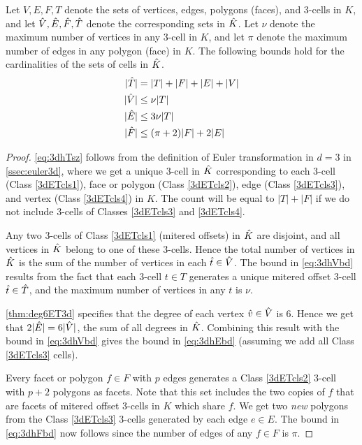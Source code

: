 \begin{lem}
  \label{lem:cntshThVhEhf3d}
  Let $V,E,F,T$ denote the sets of vertices, edges, polygons (faces), and $3$-cells in $K$, and let $\hat{V}, \hat{E}, \hat{F}, \hat{T}$ denote the corresponding sets in $\hat{K}$.
  Let $\nu$ denote the maximum number of vertices in any $3$-cell in $K$, and let $\pi$ denote the maximum number of edges in any polygon (face) in $K$.
  The following bounds hold for the cardinalities of the sets of cells in $\hat{K}$.
  \begin{align}
    |\hat{T}| &   =  |T| + |F| + |E| + |V| \label{eq:3dhTsz} \\
    |\hat{V}| & \leq \nu |T|  \label{eq:3dhVbd} \\
    |\hat{E}| & \leq 3 \nu |T| \label{eq:3dhEbd} \\
    |\hat{F}| & \leq (\pi+2)|F| + 2 |E| \label{eq:3dhFbd}
  \end{align}
\end{lem}
%
\begin{proof}
  \cref{eq:3dhTsz} follows from the definition of Euler transformation in $d=3$ in \cref{ssec:euler3d}, where we get a unique $3$-cell in $\hat{K}$ corresponding to each $3$-cell (Class \ref{3dETcls1}), face or polygon (Class \ref{3dETcls2}), edge (Class \ref{3dETcls3}), and vertex (Class \ref{3dETcls4}) in $K$.
  The count will be equal to $|T| + |F|$ if we do not include $3$-cells of Classes \ref{3dETcls3} and \ref{3dETcls4}.

  Any two $3$-cells of Class \ref{3dETcls1} (mitered offsets) in $\hat{K}$ are disjoint, and all vertices in $\hat{K}$ belong to one of these $3$-cells.
  Hence the total number of vertices in $\hat{K}$ is the sum of the number of vertices in each $\hat{t} \in \hat{V}$.
  The bound in \cref{eq:3dhVbd} results from the fact that each $3$-cell $t \in T$ generates a unique mitered offset $3$-cell $\hat{t} \in \hat{T}$, and the maximum number of vertices in any $t$ is $\nu$.

  \cref{thm:deg6ET3d} specifies that the degree of each vertex $\hat{v} \in \hat{V}$ is $6$.
  Hence we get that $2|\hat{E}| = 6|\hat{V}|$, the sum of all degrees in $\hat{K}$.
  Combining this result with the bound in \cref{eq:3dhVbd} gives the bound in \cref{eq:3dhEbd} (assuming we add all Class \ref{3dETcls3} cells).

  Every facet or polygon $f \in F$ with $p$ edges generates a Class \ref{3dETcls2} $3$-cell with $p+2$ polygons as facets.
  Note that this set includes the two copies of $f$ that are facets of mitered offset $3$-cells in $K$ which share $f$.
  We get two \emph{new} polygons from the Class \ref{3dETcls3} $3$-cells generated by each edge $e \in E$.
  The bound in \cref{eq:3dhFbd} now follows since the number of edges of any $f \in F$ is $\pi$.
\end{proof}

